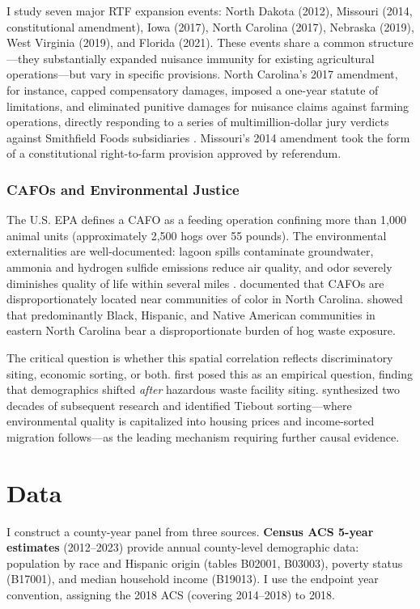 \documentclass[12pt]{article}
\begin{document}
I study seven major RTF expansion events: North Dakota (2012), Missouri (2014, constitutional amendment), Iowa (2017), North Carolina (2017), Nebraska (2019), West Virginia (2019), and Florida (2021). These events share a common structure---they substantially expanded nuisance immunity for existing agricultural operations---but vary in specific provisions. North Carolina's 2017 amendment, for instance, capped compensatory damages, imposed a one-year statute of limitations, and eliminated punitive damages for nuisance claims against farming operations, directly responding to a series of multimillion-dollar jury verdicts against Smithfield Foods subsidiaries \citep{walters2019ncpork}. Missouri's 2014 amendment took the form of a constitutional right-to-farm provision approved by referendum.

\subsubsection*{CAFOs and Environmental Justice} The U.S. EPA defines a CAFO as a feeding operation confining more than 1,000 animal units (approximately 2,500 hogs over 55 pounds). The environmental externalities are well-documented: lagoon spills contaminate groundwater, ammonia and hydrogen sulfide emissions reduce air quality, and odor severely diminishes quality of life within several miles \citep{wing2000environmental, bullers2005environmental}. \citet{nicole2013cafos} documented that CAFOs are disproportionately located near communities of color in North Carolina. \citet{heaney2015hogs} showed that predominantly Black, Hispanic, and Native American communities in eastern North Carolina bear a disproportionate burden of hog waste exposure.

The critical question is whether this spatial correlation reflects discriminatory siting, economic sorting, or both. \citet{been1994locally} first posed this as an empirical question, finding that demographics shifted \textit{after} hazardous waste facility siting. \citet{banzhaf2019environmental} synthesized two decades of subsequent research and identified Tiebout sorting---where environmental quality is capitalized into housing prices and income-sorted migration follows---as the leading mechanism requiring further causal evidence.

\section{Data}

I construct a county-year panel from three sources. \textbf{Census ACS 5-year estimates} (2012--2023) provide annual county-level demographic data: population by race and Hispanic origin (tables B02001, B03003), poverty status (B17001), and median household income (B19013). I use the endpoint year convention, assigning the 2018 ACS (covering 2014--2018) to 2018.
\end{document}
